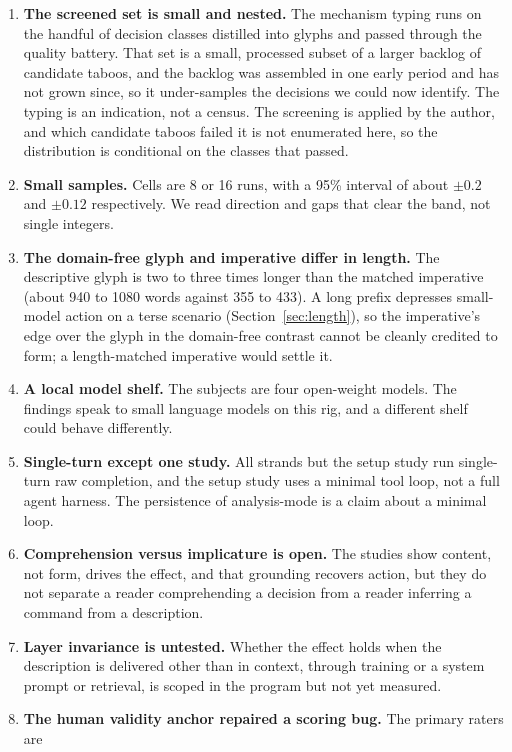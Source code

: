 \documentclass[11pt,a4paper]{article}
\begin{document}
\begin{enumerate}
  \item \textbf{The screened set is small and nested.} The mechanism typing runs on the
    handful of decision classes distilled into glyphs and passed through the quality
    battery. That set is a small, processed subset of a larger backlog of candidate
    taboos, and the backlog was assembled in one early period and has not grown since,
    so it under-samples the decisions we could now identify. The typing is an
    indication, not a census. The screening is applied by the author, and which candidate
    taboos failed it is not enumerated here, so the distribution is conditional on the
    classes that passed.
  \item \textbf{Small samples.} Cells are 8 or 16 runs, with a 95\% interval of about
    $\pm 0.2$ and $\pm 0.12$ respectively. We read direction and gaps that clear the
    band, not single integers.
  \item \textbf{The domain-free glyph and imperative differ in length.} The descriptive
    glyph is two to three times longer than the matched imperative (about 940 to 1080
    words against 355 to 433). A long prefix depresses small-model action on a terse
    scenario (Section~\ref{sec:length}), so the imperative's edge over the glyph in the
    domain-free contrast cannot be cleanly credited to form; a length-matched imperative
    would settle it.
  \item \textbf{A local model shelf.} The subjects are four open-weight models. The
    findings speak to small language models on this rig, and a different shelf could
    behave differently.
  \item \textbf{Single-turn except one study.} All strands but the setup study run
    single-turn raw completion, and the setup study uses a minimal tool loop, not a full
    agent harness. The persistence of analysis-mode is a claim about a minimal loop.
  \item \textbf{Comprehension versus implicature is open.} The studies show content, not
    form, drives the effect, and that grounding recovers action, but they do not
    separate a reader comprehending a decision from a reader inferring a command from a
    description.
  \item \textbf{Layer invariance is untested.} Whether the effect holds when the
    description is delivered other than in context, through training or a system prompt
    or retrieval, is scoped in the program but not yet measured.
  \item \textbf{The human validity anchor repaired a scoring bug.} The primary raters are

\end{enumerate}
\end{document}
